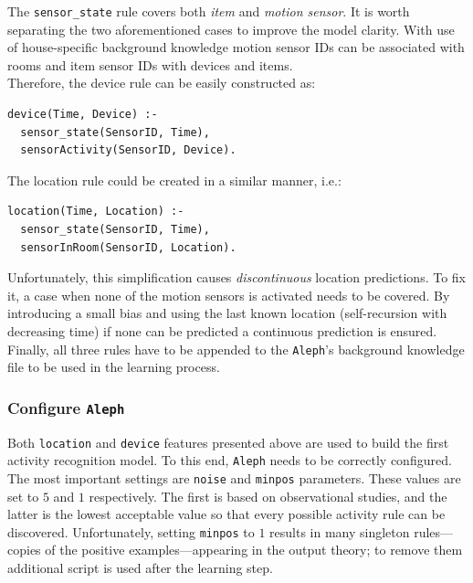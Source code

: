 \documentclass[10pt, a4paper, pdflatex, leqno, twoside, openright]{report}
\begin{document}
The \texttt{sensor\_state} rule covers both \emph{item} and \emph{motion sensor}. It is worth separating the two aforementioned cases to improve the model clarity. With use of house-specific background knowledge motion sensor IDs can be associated with rooms and item sensor IDs with devices and items.\\
Therefore, the device rule can be easily constructed as:\\
\begin{verbatim}
device(Time, Device) :-
  sensor_state(SensorID, Time),
  sensorActivity(SensorID, Device).
\end{verbatim}

The location rule could be created in a similar manner, i.e.:\\
\begin{verbatim}
location(Time, Location) :-
  sensor_state(SensorID, Time),
  sensorInRoom(SensorID, Location).
\end{verbatim}
Unfortunately, this simplification causes \emph{discontinuous} location predictions. To fix it, a case when none of the motion sensors is activated needs to be covered. By introducing a small bias and using the last known location (self-recursion with decreasing time) if none can be predicted a continuous prediction is ensured.\\

Finally, all three rules have to be appended to the \texttt{Aleph}'s background knowledge file to be used in the learning process.

      \subsubsection{Configure \texttt{Aleph}}
Both \texttt{location} and \texttt{device} features presented above are used to build the first activity recognition model. To this end, \texttt{Aleph} needs to be correctly configured.\\
The most important settings are \texttt{noise} and \texttt{minpos} parameters. These values are set to $5$ and $1$ respectively. The first is based on observational studies, and the latter is the lowest acceptable value so that every possible activity rule can be discovered. Unfortunately, setting \texttt{minpos} to $1$ results in many singleton rules---copies of the positive examples---appearing in the output theory; to remove them additional script is used after the learning step.\\
\end{document}
